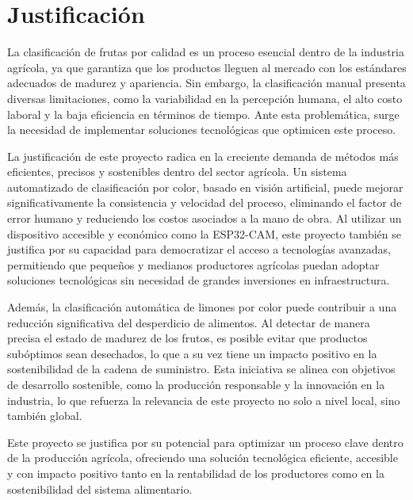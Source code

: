 \section{Justificación}

La clasificación de frutas por calidad es un proceso esencial dentro de la industria agrícola, ya que garantiza que los productos lleguen al mercado con los estándares adecuados de madurez y apariencia. Sin embargo, la clasificación manual presenta diversas limitaciones, como la variabilidad en la percepción humana, el alto costo laboral y la baja eficiencia en términos de tiempo. Ante esta problemática, surge la necesidad de implementar soluciones tecnológicas que optimicen este proceso.

La justificación de este proyecto radica en la creciente demanda de métodos más eficientes, precisos y sostenibles dentro del sector agrícola. Un sistema automatizado de clasificación por color, basado en visión artificial, puede mejorar significativamente la consistencia y velocidad del proceso, eliminando el factor de error humano y reduciendo los costos asociados a la mano de obra. Al utilizar un dispositivo accesible y económico como la ESP32-CAM, este proyecto también se justifica por su capacidad para democratizar el acceso a tecnologías avanzadas, permitiendo que pequeños y medianos productores agrícolas puedan adoptar soluciones tecnológicas sin necesidad de grandes inversiones en infraestructura.

Además, la clasificación automática de limones por color puede contribuir a una reducción significativa del desperdicio de alimentos. Al detectar de manera precisa el estado de madurez de los frutos, es posible evitar que productos subóptimos sean desechados, lo que a su vez tiene un impacto positivo en la sostenibilidad de la cadena de suministro. Esta iniciativa se alinea con objetivos de desarrollo sostenible, como la producción responsable y la innovación en la industria, lo que refuerza la relevancia de este proyecto no solo a nivel local, sino también global.

Este proyecto se justifica por su potencial para optimizar un proceso clave dentro de la producción agrícola, ofreciendo una solución tecnológica eficiente, accesible y con impacto positivo tanto en la rentabilidad de los productores como en la sostenibilidad del sistema alimentario.
